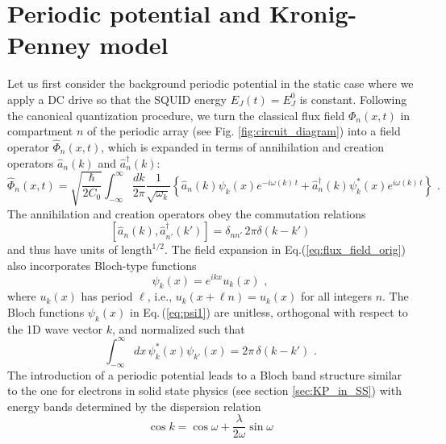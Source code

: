 \section{Periodic potential and Kronig-Penney model}\label{sec:Periodic_Potential}
%
\noindent
Let us first consider the background periodic potential in the static case where we apply a DC drive so that the SQUID energy $E_J(t) = E_J^0$ is constant. Following the canonical quantization procedure, 
we turn the classical flux field ${\Phi}_n(x,t)$ 
in compartment $n$ of the periodic array (see Fig. \ref{fig:circuit_diagram})
into a field operator $\hat{\Phi}_n(x,t)$, which is expanded in terms of 
annihilation and creation operators $ \hat{a}_n(k)$ and 
${\hat a}_n^\dagger(k)$:
%
\begin{equation} \label{eq:flux_field_orig}
    \hat{\Phi}_n(x,t) = \sqrt{\frac{\hbar}{2 C_0}} 
    \int_{-\infty}^{\infty}\frac{dk}{2 \pi} \frac{1}{\sqrt{\omega_k}}
    \left\{ \hat{a}_n(k) \psi_k(x)e^{-i \omega(k) \, t} + 
    \hat{a}_n^{\dagger}(k) \psi_k^*(x) e^{i \omega(k) \, t} \right\} \, \, .
\end{equation}
%
The annihilation and creation operators obey the commutation relations
%
\begin{equation} \label{eq:cra_orig}
    \left[ \hat{a}_n(k),{\hat a}_{n'}^\dagger(k') \right] = \delta_{nn'} \, 2 \pi \delta(k - k')
\end{equation}
%
and thus have units of $\text{length}^{1/2}$.
The field expansion in Eq.(\ref{eq:flux_field_orig}) also incorporates Bloch-type functions 
%
\begin{equation} \label{eq:psi1}
\psi_k(x) = e^{i k x} u_k(x) \, \, ,   
\end{equation}
%
where $u_k(x)$ has period $\ell$, i.e., $u_k(x + \ell n) = u_k(x)$ for all integers $n$.
The Bloch functions $\psi_k(x)$ in Eq.\,(\ref{eq:psi1}) are unitless, orthogonal with respect to 
the 1D wave vector $k$, and normalized such that
%
\begin{equation} \label{eq:psi1_norm_orig}
\int_{-\infty}^{\infty} dx \, \psi^*_k(x) \psi_{k'}(x) = 2 \pi \, \delta(k - k') \, \, .
\end{equation}
%
%
The introduction of a periodic potential leads to a Bloch band structure similar to the one for electrons in solid state physics (see section \ref{sec:KP_in_SS}) with energy bands determined by the dispersion relation
\begin{equation}\label{eq:disp_rel}
    \cos{k} = \cos{\omega} + \frac{\lambda}{2\omega}\sin{\omega}
\end{equation}
